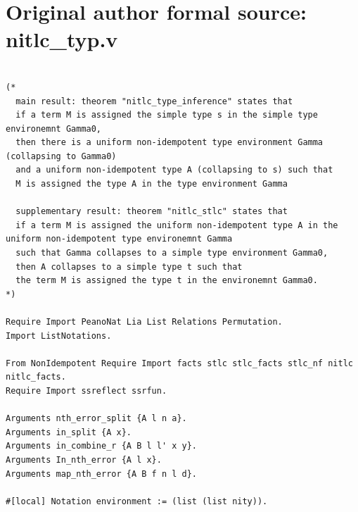 \documentclass[10pt,a4paper]{article}
\begin{document}
\section*{Original author formal source: nitlc\_typ.v}
\begin{lstlisting}[style=authorcoq]

(*
  main result: theorem "nitlc_type_inference" states that
  if a term M is assigned the simple type s in the simple type environemnt Gamma0,
  then there is a uniform non-idempotent type environment Gamma (collapsing to Gamma0)
  and a uniform non-idempotent type A (collapsing to s) such that
  M is assigned the type A in the type environment Gamma

  supplementary result: theorem "nitlc_stlc" states that
  if a term M is assigned the uniform non-idempotent type A in the uniform non-idempotent type environemnt Gamma
  such that Gamma collapses to a simple type environment Gamma0,
  then A collapses to a simple type t such that
  the term M is assigned the type t in the environemnt Gamma0.
*)

Require Import PeanoNat Lia List Relations Permutation.
Import ListNotations.

From NonIdempotent Require Import facts stlc stlc_facts stlc_nf nitlc nitlc_facts.
Require Import ssreflect ssrfun.

Arguments nth_error_split {A l n a}.
Arguments in_split {A x}.
Arguments in_combine_r {A B l l' x y}.
Arguments In_nth_error {A l x}.
Arguments map_nth_error {A B f n l d}.

#[local] Notation environment := (list (list nity)).


\end{lstlisting}
\end{document}

